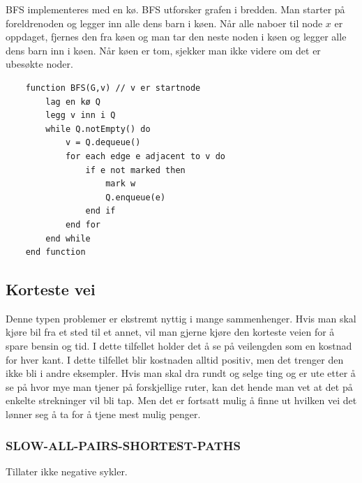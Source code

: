 \noindent BFS implementeres med en kø. BFS utforsker grafen i bredden. Man starter på foreldrenoden og legger inn alle dens barn i køen. Når alle naboer til node $x$ er oppdaget, fjernes den fra køen og man tar den neste noden i køen og legger alle dens barn inn i køen. Når køen er tom, sjekker man ikke videre om det er ubesøkte noder.

\begin{lstlisting}
    function BFS(G,v) // v er startnode
	    lag en kø Q
    	legg v inn i Q
    	while Q.notEmpty() do
    		v = Q.dequeue()
    		for each edge e adjacent to v do
    			if e not marked then
    				mark w
    				Q.enqueue(e)
    			end if
    		end for
    	end while
    end function

\end{lstlisting}

\subsection{Korteste vei}
Denne typen problemer er ekstremt nyttig i mange sammenhenger. Hvis man skal kjøre bil fra et sted til et annet, vil man gjerne kjøre den korteste veien for å spare bensin og tid. I dette tilfellet holder det å se på veilengden som en kostnad for hver kant. I dette tilfellet blir kostnaden alltid positiv, men det trenger den ikke bli i andre eksempler. Hvis man skal dra rundt og selge ting og er ute etter å se på hvor mye man tjener på forskjellige ruter, kan det hende man vet at det på enkelte strekninger vil bli tap. Men det er fortsatt mulig å finne ut hvilken vei det lønner seg å ta for å tjene mest mulig penger.

\subsubsection{SLOW-ALL-PAIRS-SHORTEST-PATHS}
Tillater ikke negative sykler.

